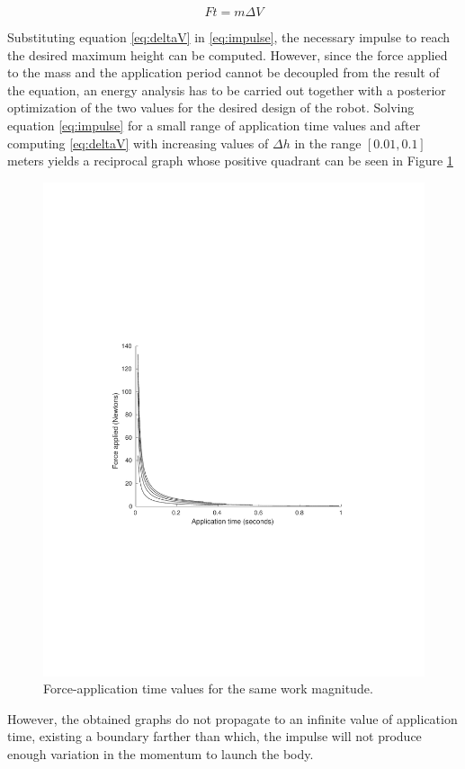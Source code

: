 \begin{equation}
\label{eq:impulse}
	F  t = m  \Delta V	
\end{equation} 

Substituting equation \ref{eq:deltaV} in \ref{eq:impulse}, the necessary impulse to reach the desired maximum height can be computed.
However, since the force applied to the mass and the application period cannot be decoupled from the result of the equation, an energy analysis has to be carried out together with a posterior optimization of the two values for the desired design of the robot.
Solving equation \ref{eq:impulse} for a small range of application time values and after computing \ref{eq:deltaV} with increasing values of $\Delta h$ in the range $[0.01,0.1]$ meters yields a reciprocal graph whose positive quadrant can be seen in Figure \ref{fig:f-t}
\begin{figure}[ht!]
	\centering
	\includegraphics[width=\textwidth]{figures/force-timePlot.pdf}
	\caption{Force-application time values for the same work magnitude.}
	\label{fig:f-t}
\end{figure}
However, the obtained graphs do not propagate to an infinite value of application time, existing a boundary farther than which, the impulse will not produce enough variation in the momentum to launch the body.

